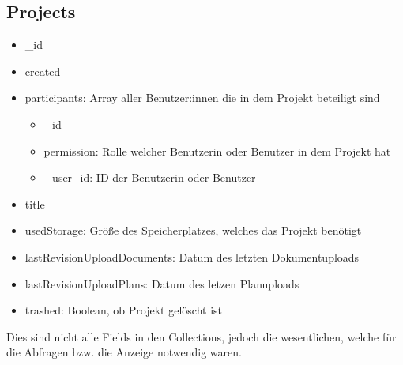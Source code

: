 \subsection{Projects}
\begin{itemize}
    \item \_id
    \item created
    \item participants: Array aller Benutzer:innen die in dem Projekt beteiligt sind
        \begin{itemize}
            \item \_id
            \item permission: Rolle welcher Benutzerin oder Benutzer in dem Projekt hat
            \item \_user\_id: ID der Benutzerin oder Benutzer
        \end{itemize}
    \item title
    \item usedStorage: Größe des Speicherplatzes, welches das Projekt benötigt
    \item lastRevisionUploadDocuments: Datum des letzten Dokumentuploads
    \item lastRevisionUploadPlans: Datum des letzen Planuploads
    \item trashed: Boolean, ob Projekt gelöscht ist
\end{itemize}
Dies sind nicht alle Fields in den Collections, jedoch die wesentlichen, welche für die Abfragen bzw. die Anzeige notwendig waren.